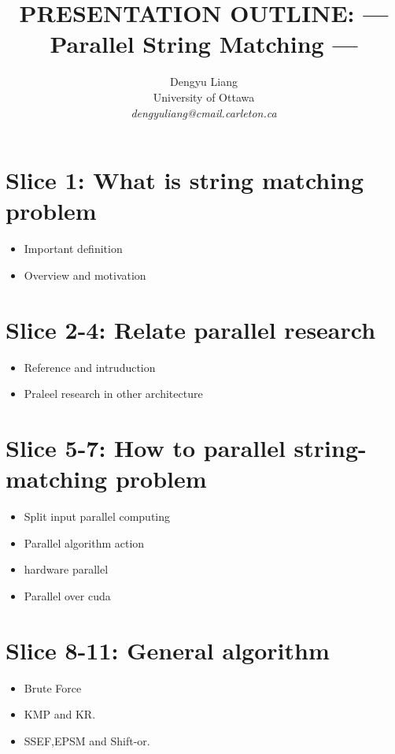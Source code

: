 \documentclass[11pt]{article}       %
\newenvironment{slide}[1]        {\section{#1} \begin{itemize}}%
                                 {\end{itemize}}
\begin{document}


\title{PRESENTATION OUTLINE: --- Parallel String Matching ---}


\author{
Dengyu Liang\\
University of Ottawa\\
{\em dengyuliang@cmail.carleton.ca}
} %

\maketitle

\begin{slide}{Slice 1: What is string matching problem}
\item Important definition
\item Overview and motivation
\end{slide}

\begin{slide}{Slice 2-4: Relate parallel research}
\item Reference and intruduction
\item Praleel research in other architecture
\end{slide}

\begin{slide}{Slice 5-7: How to parallel string-matching problem}
\item Split input parallel computing
\item Parallel algorithm action
\item hardware parallel
\item Parallel over cuda
\end{slide}

\begin{slide}{Slice 8-11: General algorithm}
\item Brute Force
\item KMP and KR.
\item SSEF,EPSM and Shift-or. 
\end{slide}
\end{document}

